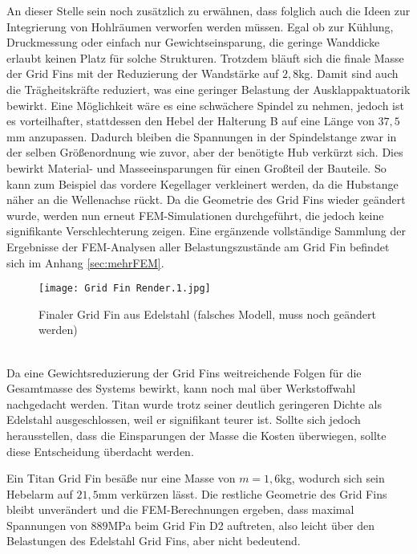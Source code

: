 An dieser Stelle sein noch zusätzlich zu erwähnen, dass folglich auch die Ideen zur Integrierung von Hohlräumen verworfen werden müssen. Egal ob zur Kühlung, Druckmessung oder einfach nur Gewichtseinsparung, die geringe Wanddicke erlaubt keinen Platz für solche Strukturen. Trotzdem bläuft sich die finale Masse der Grid Fins mit der Reduzierung der Wandstärke auf $2,8$kg. Damit sind auch die Trägheitskräfte reduziert, was eine geringer Belastung der Ausklappaktuatorik bewirkt. Eine Möglichkeit wäre es eine schwächere Spindel zu nehmen, jedoch ist es vorteilhafter, stattdessen den Hebel der Halterung B auf eine Länge von $37,5$mm anzupassen. Dadurch bleiben die Spannungen in der Spindelstange zwar in der selben Größenordnung wie zuvor, aber der benötigte Hub verkürzt sich. Dies bewirkt Material- und Masseeinsparungen für einen Großteil der Bauteile. So kann zum Beispiel das vordere Kegellager verkleinert werden, da die Hubstange näher an die Wellenachse rückt. Da die Geometrie des Grid Fins wieder geändert wurde, werden nun erneut FEM-Simulationen durchgeführt, die jedoch keine signifikante Verschlechterung zeigen.
Eine ergänzende vollständige Sammlung der Ergebnisse der FEM-Analysen aller Belastungszustände am Grid Fin befindet sich im Anhang \ref{sec:mehrFEM}.
\begin{figure}[h] 
	\centering
	\texttt{[image: Grid Fin Render.1.jpg]}
	\caption{Finaler Grid Fin aus Edelstahl (falsches Modell, muss noch geändert werden)}
\end{figure}\\
Da eine Gewichtsreduzierung der Grid Fins weitreichende Folgen für die Gesamtmasse des Systems bewirkt, kann noch mal über Werkstoffwahl nachgedacht werden. Titan wurde trotz seiner deutlich geringeren Dichte als Edelstahl ausgeschlossen, weil er signifikant teurer ist. Sollte sich jedoch herausstellen, dass die Einsparungen der Masse die Kosten überwiegen, sollte diese Entscheidung überdacht werden.

Ein Titan Grid Fin besäße nur eine Masse von $m=1,6$kg, wodurch sich sein Hebelarm auf $21,5$mm verkürzen lässt. Die restliche Geometrie des Grid Fins bleibt unverändert und die FEM-Berechnungen ergeben, dass maximal Spannungen von $889$MPa beim Grid Fin D2 auftreten, also leicht über den Belastungen des Edelstahl Grid Fins, aber nicht bedeutend.

